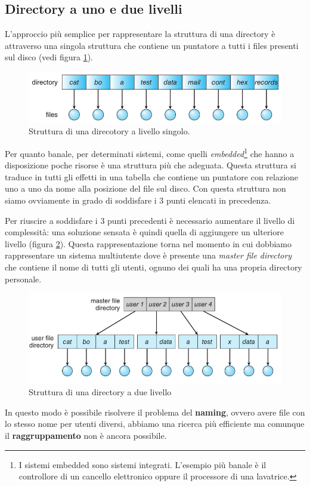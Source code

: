 \subsection{Directory a uno e due livelli}
L'approccio più semplice per rappresentare la struttura di una directory è attraverso una singola struttura che contiene un puntatore a tutti i files presenti sul disco (vedi figura \ref{fig:single-level dir}).
\begin{figure}[h]
    \centering
    \includegraphics[width = .7\textwidth]{../res/imgs/file system interface/single-level dir.png}
    \caption{Struttura di una direcotory a livello singolo.}
    \label{fig:single-level dir}
\end{figure}
Per quanto banale, per determinati sistemi, come quelli \textit{embedded}\footnote{I sistemi embedded sono sistemi integrati. L'esempio più banale è il controllore di un cancello elettronico oppure il processore di una lavatrice.} che hanno a disposizione poche risorse è una struttura più che adeguata. Questa struttura si traduce in tutti gli effetti in una tabella che contiene un puntatore con relazione uno a uno da nome alla posizione del file sul disco. Con questa struttura non siamo ovviamente in grado di soddisfare i 3 punti elencati in precedenza.

Per riuscire a soddisfare i 3 punti precedenti è necessario aumentare il livello di complessità: una soluzione sensata è quindi quella di aggiungere un ulteriore livello (figura \ref{fig:two-level dir}). Questa rappresentazione torna nel momento in cui dobbiamo rappresentare un sistema multiutente dove è presente una \textit{master file directory} che contiene il nome di tutti gli utenti, ognuno dei quali ha una propria directory personale.
\begin{figure}[h]
    \centering
    \includegraphics[width = .65\textwidth]{../res/imgs/file system interface/two-level dir.png}
    \caption{Struttura di una directory a due livello}
    \label{fig:two-level dir}
\end{figure}
In questo modo è possibile risolvere il problema del \textbf{naming}, ovvero avere file con lo stesso nome per utenti diversi, abbiamo una ricerca più efficiente ma comunque il \textbf{raggruppamento} non è ancora possibile.

